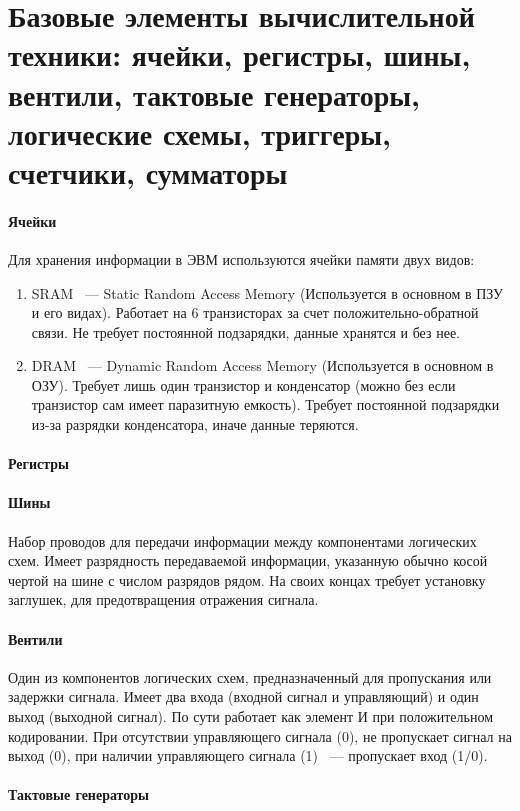 \documentclass[11pt]{article}
\begin{document}
	\section{Базовые элементы вычислительной техники: ячейки, регистры, шины, вентили, тактовые генераторы, логические схемы, триггеры, счетчики, сумматоры}
	\paragraph{Ячейки}
	Для хранения информации в ЭВМ используются ячейки памяти двух видов:
	\begin{enumerate}
		\item SRAM ~--- Static Random Access Memory (Используется в основном в ПЗУ и его видах). Работает на 6 транзисторах за счет положительно-обратной связи. Не требует постоянной подзарядки, данные хранятся и без нее.
		\item DRAM ~--- Dynamic Random Access Memory (Используется в основном в ОЗУ). Требует лишь один транзистор и конденсатор (можно без если транзистор сам имеет паразитную емкость). Требует постоянной подзарядки из-за разрядки конденсатора, иначе данные теряются.
	\end{enumerate}
	\paragraph{Регистры}
	\paragraph{Шины}
	Набор проводов для передачи информации между компонентами логических схем. Имеет разрядность передаваемой информации, указанную обычно косой чертой на шине с числом разрядов рядом. На своих концах требует установку заглушек, для предотвращения отражения сигнала.
	\paragraph{Вентили}
	Один из компонентов логических схем, предназначенный для пропускания или задержки сигнала. Имеет два входа (входной сигнал и управляющий) и один выход (выходной сигнал). По сути работает как элемент И при положительном кодировании. При отсутствии управляющего сигнала (0), не пропускает сигнал на выход (0), при наличии управляющего сигнала (1) ~--- пропускает вход (1/0).
	\paragraph{Тактовые генераторы}
\end{document}
